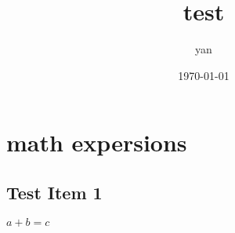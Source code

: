\documentclass{book}
\title{test}
\author{yan}
\date{\today}
\begin{document}
\frontmatter
\maketitle
\tableofcontents

\mainmatter
\part{math expersions}
\chapter{Test Item 1}

$a + b = c$

\equation{

}
\end{document}
